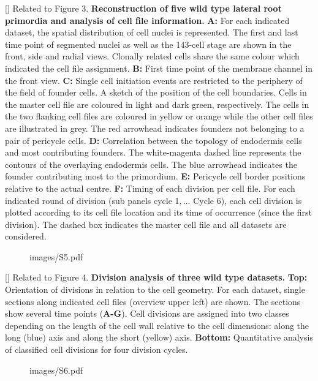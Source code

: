 []{
Related to Figure 3.
{\bf Reconstruction of five wild type lateral root primordia and analysis of cell file information.} {\bf A:} For each indicated dataset, the spatial distribution of cell nuclei is represented. The first and last time point of segmented nuclei as well as the 143-cell stage are shown in the front, side and radial views. Clonally related cells share the same colour which indicated the cell file assignment. {\bf B:} First time point of the membrane channel in the front view. {\bf C:} Single cell initiation events are restricted to the periphery of the field of founder cells. A sketch of the position of the cell boundaries. Cells in the master cell file are coloured in light and dark green, respectively. The cells in the two flanking cell files are coloured in yellow or orange while the other cell files are illustrated in grey. The red arrowhead indicates founders not belonging to a pair of pericycle cells. {\bf D:} Correlation between the topology of endodermis cells and most contributing founders. The white-magenta dashed line represents the contours of the overlaying endodermis cells. The blue arrowhead indicates the founder contributing most to the primordium. {\bf E:} Pericycle cell border positions relative to the actual centre. {\bf F:} Timing of each division per cell file. For each indicated round of division (sub panels cycle 1$, \ldots$ Cycle 6), each cell division is plotted according to its cell file location and its time of occurrence (since the first division). The dashed box indicates the master cell file and all datasets are considered.
}
\label{fig:S4}
%
\clearpage
%
\begin{figure}[htbp]
\centering
	\begin{overpic}[width=1.\linewidth]{images/S5.pdf}
	\end{overpic}
\end{figure}
\clearpage
{}[]{
Related to Figure 4.
{\bf Division analysis of three wild type datasets.} {\bf Top:} Orientation of divisions in relation to the cell geometry. For each dataset, single sections along indicated cell files (overview upper left) are shown. The sections show several time points (\textbf{A-G}). Cell divisions are assigned into two classes depending on the length of the cell wall relative to the cell dimensions: along the long (blue) axis and along the short (yellow) axis. {\bf Bottom:} Quantitative analysis of classified cell divisions for four division cycles.
}
\label{fig:S5}
%
\clearpage
%
\begin{figure}[htbp]
\centering
	\begin{overpic}[width=0.8\linewidth]{images/S6.pdf}
	\end{overpic}
\end{figure}
